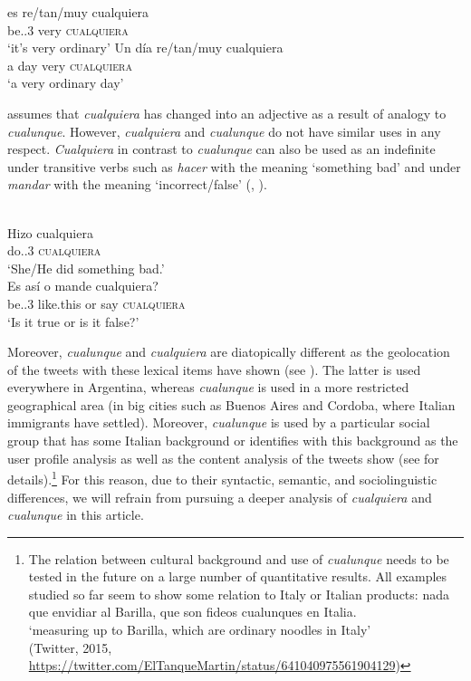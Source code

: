 \documentclass[output=paper,colorlinks,citecolor=brown]{langscibook}
\begin{document}
\ea\label{ex:fk16}
    \gll es re/tan/muy cualquiera\\
    be.{\PRS.3\SG} very \textsc{cualquiera}\\
    \glt ‘it’s very ordinary’
\ex \label{ex:fk17}
    \gll  Un día re/tan/muy cualquiera\\
    a day very \textsc{cualquiera}\\
  \glt  ‘a very ordinary day’
\z



\citet{RizzoSalierno2013} assumes that \textit{cualquiera} has changed into an adjective as a result of analogy to \textit{cualunque}. However, \textit{cualquiera} and \textit{cualunque} do not have similar uses in any respect. \textit{Cualquiera} in contrast to \textit{cualunque} can also be used as an indefinite under transitive verbs such as \textit{hacer} with the meaning ‘something bad’ and under \textit{mandar} with the meaning ‘incorrect/false’ (\cite{DiTullio2015}, \cite{Kellert2021c}).

\ea\label{ex:fk18}\citep{Kellert2021c}\\
    \gll Hizo cualquiera\\
    do.{\PST.3\SG} \textsc{cualquiera}\\
    \glt ‘She/He did something bad.’
\ex\label{ex:fk19}   \citep{Kellert2021c}\\
    \gll Es así o mande cualquiera?\\
    be.{\PRS.3\SG} like.this or say \textsc{cualquiera}\\
    \glt ‘Is it true or is it false?’
\z\largerpage[2]

Moreover, \textit{cualunque} and \textit{cualquiera} are diatopically different as the geolocation of the tweets with these lexical items have shown (see ). The latter is used everywhere in Argentina, whereas \textit{cualunque} is used in a more restricted geographical area (in big cities such as Buenos Aires and Cordoba, where Italian immigrants have settled). Moreover, \textit{cualunque} is used by a particular social group that has some Italian background or identifies with this background as the user profile analysis as well as the content analysis of the tweets show (see \cite{Kellert2021b} for details).\footnote{The relation between cultural background and use of \textit{cualunque} needs to be tested in the future on a large number of quantitative results. All examples studied so far seem to show some relation to Italy or Italian products:
\ea nada que envidiar al Barilla, que son fideos cualunques en Italia.\\
‘measuring up to Barilla, which are ordinary noodles in Italy’\\
(Twitter, 2015, \url{https://twitter.com/ElTanqueMartin/status/641040975561904129})\z} For this reason, due to their syntactic, semantic, and sociolinguistic differences, we will refrain from pursuing a deeper analysis of \textit{cualquiera} and \textit{cualunque} in this article.
\end{document}
